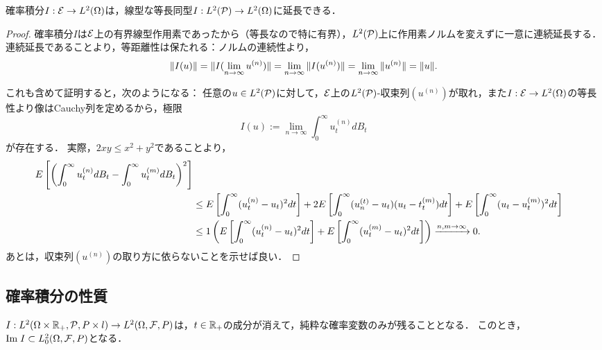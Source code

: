 \documentclass[uplatex,dvipdfmx]{jsreport}
\begin{document}
\begin{corollary}[確率積分の等距離延長]\label{cor-extention-of-SI}
    確率積分$I:\E\to L^2(\Om)$は，線型な等長同型$I:L^2(\P)\to L^2(\Om)$に延長できる．
\end{corollary}
\begin{proof}
    確率積分$I$は$\E$上の有界線型作用素であったから（等長なので特に有界），$L^2(\P)$上に作用素ノルムを変えずに一意に連続延長する．
    連続延長であることより，等距離性は保たれる：ノルムの連続性より，
    \[\norm{I(u)}=\norm{I(\lim_{n\to\infty}u^{(n)})}=\lim_{n\to\infty}\norm{I(u^{(n)})}=\lim_{n\to\infty}\norm{u^{(n)}}=\norm{u}.\]

    これも含めて証明すると，次のようになる：
    任意の$u\in L^2(\P)$に対して，$\E$上の$L^2(\P)$-収束列$(u^{(n)})$が取れ，また$I:\E\to L^2(\Om)$の等長性より像はCauchy列を定めるから，極限
    \[I(u):=\lim_{n\to\infty}\int^\infty_0u_t^{(n)}dB_t\]
    が存在する．
    実際，$2xy\le x^2+y^2$であることより，
    \begin{align*}
        E\Square{\paren{\int^\infty_0u_t^{(n)}dB_t-\int^\infty_0u_t^{(m)}dB_t}^2}\\
        &\le E\Square{\int^\infty_0(u_t^{(n)}-u_t)^2dt}+2E\Square{\int^\infty_0(u_n^{(t)}-u_t)(u_t-t_t^{(m)})dt}+E\Square{\int^\infty_0(u_t-u_t^{(m)})^2dt}\\
        &\le 1\paren{E\Square{\int^\infty_0(u_t^{(n)}-u_t)^2dt}+E\Square{\int^\infty_0(u_t^{(m)}-u_t)^2dt}}\xrightarrow{n,m\to\infty}0.
    \end{align*}
    あとは，収束列$(u^{(n)})$の取り方に依らないことを示せば良い．
\end{proof}

\subsection{確率積分の性質}

\begin{tcolorbox}[colframe=ForestGreen, colback=ForestGreen!10!white,breakable,colbacktitle=ForestGreen!40!white,coltitle=black,fonttitle=\bfseries\sffamily,
title=]
    $I:L^2(\Om\times\R_+,\P,P\times l)\to L^2(\Om,\F,P)$は，$t\in\R_+$の成分が消えて，純粋な確率変数のみが残ることとなる．
    このとき，$\Im I\subset L^2_0(\Om,\F,P)$となる．
\end{tcolorbox}
\end{document}
